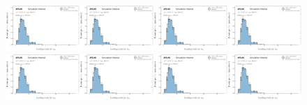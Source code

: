\begin{figure}[h!]
\includegraphics[width=0.25\textwidth,page=5]{figures/SimResults/MultiFoldTotalErrors.pdf}\includegraphics[width=0.25\textwidth,page=6]{figures/SimResults/MultiFoldTotalErrors.pdf}\includegraphics[width=0.25\textwidth,page=7]{figures/SimResults/MultiFoldTotalErrors.pdf}\includegraphics[width=0.25\textwidth,page=8]{figures/SimResults/MultiFoldTotalErrors.pdf}\\
\includegraphics[width=0.25\textwidth,page=9]{figures/SimResults/MultiFoldTotalErrors.pdf}\includegraphics[width=0.25\textwidth,page=10]{figures/SimResults/MultiFoldTotalErrors.pdf}\includegraphics[width=0.25\textwidth,page=11]{figures/SimResults/MultiFoldTotalErrors.pdf}\includegraphics[width=0.25\textwidth,page=12]{figures/SimResults/MultiFoldTotalErrors.pdf}\\

\end{figure}
